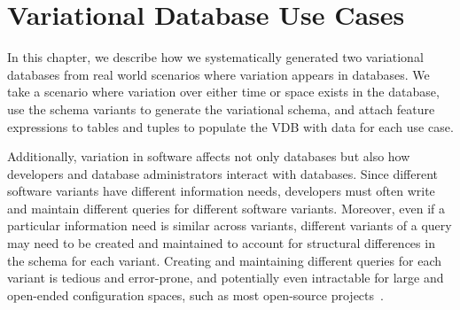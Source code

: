 \chapter{Variational Database Use Cases}
\label{ch:vdbusecase}


In this chapter, we describe how we systematically generated two 
variational databases from real world scenarios where variation appears
in databases. We take a scenario where variation over either time or space
exists in the database, use the schema variants to generate the variational schema, 
and attach feature expressions to tables and tuples to populate the VDB with
data for each use case. 

Additionally, variation in software affects not only databases but also how developers and
database administrators interact with databases.
%
Since different software variants have different information needs, developers
must often write and maintain different queries for different software
variants. Moreover, even if a particular information need is similar across
variants, different variants of a query may need to be created and maintained
to account for structural differences in the schema for each variant.
%
Creating and maintaining different queries for each variant is tedious and
error-prone, and potentially even intractable for large and open-ended
configuration spaces, such as most open-source projects~\cite{dbDecay16Stonebraker}.


